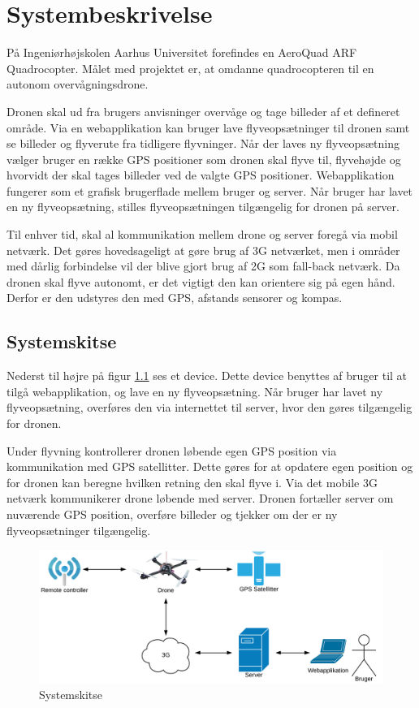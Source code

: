 \chapter{Systembeskrivelse}
\vspace{-1cm}
På Ingeniørhøjskolen Aarhus Universitet forefindes en AeroQuad ARF Quadrocopter. 
Målet med projektet er, at omdanne quadrocopteren til en autonom overvågningsdrone.

Dronen skal ud fra brugers anvisninger overvåge og tage billeder af et defineret område. 
Via en webapplikation kan bruger lave flyveopsætninger til dronen samt se billeder og flyverute fra tidligere flyvninger. 
Når der laves ny flyveopsætning vælger bruger en række GPS positioner som dronen skal flyve til, flyvehøjde og hvorvidt der skal tages billeder ved de valgte GPS positioner. Webapplikation fungerer som et grafisk brugerflade mellem bruger og server. Når bruger har lavet en ny flyveopsætning, stilles flyveopsætningen tilgængelig for dronen på server.  

Til enhver tid, skal al kommunikation mellem drone og server foregå via mobil netværk. Det gøres hovedsageligt at gøre brug af 3G netværket, men i områder med dårlig forbindelse vil der blive gjort brug af 2G som fall-back netværk. Da dronen skal flyve autonomt, er det vigtigt den kan orientere sig på egen hånd. Derfor er den udstyres den med GPS, afstands sensorer og kompas.
\vspace{-0.5cm}


\section*{Systemskitse}
\vspace{-0.5cm}
Nederst til højre på figur \ref{fig:Systemskitse} ses et device. Dette device benyttes af bruger til at tilgå webapplikation, og lave en ny flyveopsætning. Når bruger har lavet ny flyveopsætning, overføres den via internettet til server, hvor den gøres tilgængelig for dronen.
 

Under flyvning kontrollerer dronen løbende egen GPS position via kommunikation med GPS satellitter. Dette gøres for at opdatere egen position og for dronen kan beregne hvilken retning den skal flyve i. Via det mobile 3G netværk kommunikerer drone løbende med server. Dronen fortæller server om nuværende GPS position, overføre billeder og tjekker om der er ny flyveopsætninger tilgængelig. 

\vspace{-5pt}
\begin{figure}[H]
\centering
\includegraphics[width=1\textwidth]{Billeder/Projektbeskrivelse.png}
\vspace{-.5cm}
\caption{Systemskitse}
\label{fig:Systemskitse}
\end{figure}